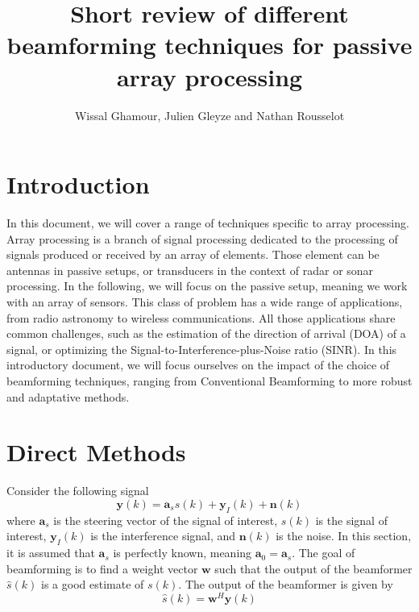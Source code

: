 \documentclass[12pt]{article}
\title{Short review of different beamforming techniques for passive array processing} %
\author{Wissal Ghamour, Julien Gleyze and Nathan Rousselot}
\begin{document}
\maketitle
\section{Introduction}
In this document, we will cover a range of techniques specific to array processing. Array processing is a branch of signal processing dedicated to the processing of signals produced or received by an array of elements. Those element can be antennas in passive setups, or transducers in the context of radar or sonar processing. In the following, we will focus on the passive setup, meaning we work with an array of sensors. This class of problem has a wide range of applications, from radio astronomy to wireless communications. All those applications share common challenges, such as the estimation of the direction of arrival (DOA) of a signal, or optimizing the Signal-to-Interference-plus-Noise ratio (SINR). In this introductory document, we will focus ourselves on the impact of the choice of beamforming techniques, ranging from Conventional Beamforming to more robust and adaptative methods.
\section{Direct Methods}
Consider the following signal
\begin{equation}\label{eq:signal}
   \mathbf{y}(k) = \mathbf{a}_ss(k) + \mathbf{y}_{I}(k) + \mathbf{n}(k)
\end{equation}
where $\mathbf{a}_s$ is the steering vector of the signal of interest, $s(k)$ is the signal of interest, $\mathbf{y}_{I}(k)$ is the interference signal, and $\mathbf{n}(k)$ is the noise. In this section, it is assumed that $\mathbf{a}_s$ is perfectly known, meaning $\mathbf{a}_0 = \mathbf{a}_s$. The goal of beamforming is to find a weight vector $\mathbf{w}$ such that the output of the beamformer $\hat{s}(k)$ is a good estimate of $s(k)$. The output of the beamformer is given by
\begin{equation}\label{eq:bf}
   \hat{s}(k) = \mathbf{w}^H\mathbf{y}(k)
\end{equation}
\end{document}
